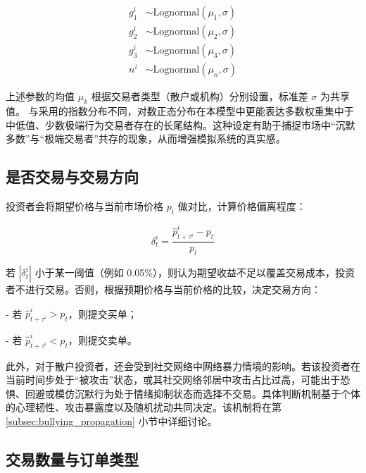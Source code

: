 \begin{equation}
    \begin{aligned}
    g_1^i &\sim \text{Lognormal}(\mu_1, \sigma) \\
    g_2^i &\sim \text{Lognormal}(\mu_2, \sigma) \\
    g_3^i &\sim \text{Lognormal}(\mu_3, \sigma) \\
    n^i   &\sim \text{Lognormal}(\mu_{n}, \sigma)
    \end{aligned}
\end{equation}
    

上述参数的均值 \(\mu_k\) 根据交易者类型（散户或机构）分别设置，标准差 \(\sigma\) 为共享值。
与\textcite{chiarella2009}采用的指数分布不同，对数正态分布在本模型中更能表达多数权重集中于中低值、少数极端行为交易者存在的长尾结构。这种设定有助于捕捉市场中“沉默多数”与“极端交易者”共存的现象，从而增强模拟系统的真实感。




\subsection{是否交易与交易方向}
\label{subsec:trade direction}

投资者会将期望价格与当前市场价格 \( p_t \) 做对比，计算价格偏离程度：

\begin{equation}
    \delta_t^i = \frac{\widehat{p}_{t+\tau^i}^i - p_t}{p_t}
\end{equation}

若 \(|\delta_t^i|\) 小于某一阈值（例如 0.05\%），则认为期望收益不足以覆盖交易成本，投资者不进行交易。否则，根据预期价格与当前价格的比较，决定交易方向：

- 若 \(\widehat{p}_{t+\tau^i}^i > p_t\)，则提交买单；

- 若 \(\widehat{p}_{t+\tau^i}^i < p_t\)，则提交卖单。

此外，对于散户投资者，还会受到社交网络中网络暴力情境的影响。若该投资者在当前时间步处于“被攻击”状态，或其社交网络邻居中攻击占比过高，可能出于恐惧、回避或模仿沉默行为处于情绪抑制状态而选择不交易。具体判断机制基于个体的心理韧性、攻击暴露度以及随机扰动共同决定。该机制将在第 \ref{subsec:bullying_propagation} 小节中详细讨论。

\subsection{交易数量与订单类型}
\label{subsec:trade qty and order type}

